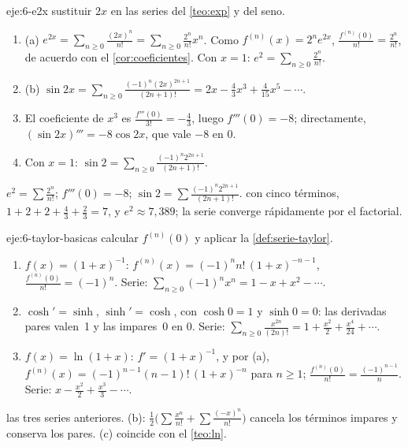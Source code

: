\begin{solucion}{eje:6-e2x}
\planteamiento sustituir $2x$ en las series del \cref{teo:exp} y del seno.
\pasos
\begin{enumerate}[label=\arabic*.]
  \item (a) $e^{2x}=\sum_{n\ge0}\frac{(2x)^{n}}{n!}=\sum_{n\ge0}\frac{2^{n}}{n!}x^{n}$. Como $f^{(n)}(x)=2^{n}e^{2x}$, $\frac{f^{(n)}(0)}{n!}=\frac{2^{n}}{n!}$, de acuerdo con el \cref{cor:coeficientes}. Con $x=1$: $e^{2}=\sum_{n\ge0}\frac{2^{n}}{n!}$.
  \item (b) $\sin2x=\sum_{n\ge0}\frac{(-1)^{n}(2x)^{2n+1}}{(2n+1)!}=2x-\frac43x^{3}+\frac{4}{15}x^{5}-\cdots$.
  \item El coeficiente de $x^{3}$ es $\frac{f'''(0)}{3!}=-\frac43$, luego $f'''(0)=-8$; directamente, $(\sin2x)'''=-8\cos2x$, que vale $-8$ en $0$.
  \item Con $x=1$: $\sin2=\sum_{n\ge0}\frac{(-1)^{n}2^{2n+1}}{(2n+1)!}$.
\end{enumerate}
\resultado $e^{2}=\sum\frac{2^{n}}{n!}$; $f'''(0)=-8$; $\sin2=\sum\frac{(-1)^{n}2^{2n+1}}{(2n+1)!}$.
\comprobacion con cinco términos, $1+2+2+\frac43+\frac23=7$, y $e^{2}\approx7{,}389$; la serie converge rápidamente por el factorial.
\end{solucion}

\begin{solucion}{eje:6-taylor-basicas}
\planteamiento calcular $f^{(n)}(0)$ y aplicar la \cref{def:serie-taylor}.
\pasos
\begin{enumerate}[label=(\alph*)]
  \item $f(x)=(1+x)^{-1}$: $f^{(n)}(x)=(-1)^{n}n!\,(1+x)^{-n-1}$, $\frac{f^{(n)}(0)}{n!}=(-1)^{n}$. Serie: $\sum_{n\ge0}(-1)^{n}x^{n}=1-x+x^{2}-\cdots$.
  \item $\cosh'=\sinh$, $\sinh'=\cosh$, con $\cosh0=1$ y $\sinh0=0$: las derivadas pares valen~1 y las impares~0 en $0$. Serie: $\sum_{n\ge0}\frac{x^{2n}}{(2n)!}=1+\frac{x^{2}}{2}+\frac{x^{4}}{24}+\cdots$.
  \item $f(x)=\ln(1+x)$: $f'=(1+x)^{-1}$, y por (a), $f^{(n)}(x)=(-1)^{n-1}(n-1)!\,(1+x)^{-n}$ para $n\ge1$; $\frac{f^{(n)}(0)}{n!}=\frac{(-1)^{n-1}}{n}$. Serie: $x-\frac{x^{2}}{2}+\frac{x^{3}}{3}-\cdots$.
\end{enumerate}
\resultado las tres series anteriores.
\comprobacion (b): $\frac12\bigl(\sum\frac{x^{n}}{n!}+\sum\frac{(-x)^{n}}{n!}\bigr)$ cancela los términos impares y conserva los pares. (c) coincide con el \cref{teo:ln}.
\end{solucion}

